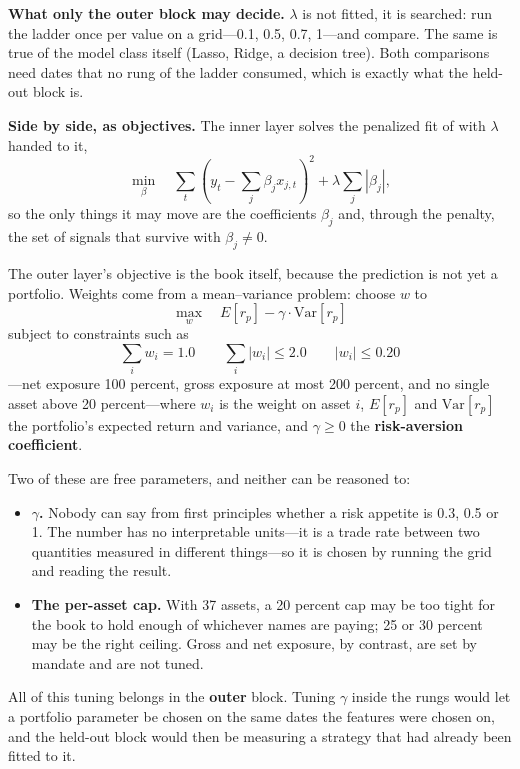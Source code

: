 \textbf{What only the outer block may decide.} $\lambda$ is not fitted, it is searched: run the
ladder once per value on a grid---0.1, 0.5, 0.7, 1---and compare. The same is true of the model class itself (Lasso, Ridge, a decision tree). Both
comparisons need dates that no rung of the ladder consumed, which is exactly what the held-out
block is.

\textbf{Side by side, as objectives.} The inner layer solves the penalized fit of
 with $\lambda$ handed to it,
\[
  \min_{\beta} \quad \sum_t \left( y_t - \sum_j \beta_j x_{j,t} \right)^{2}
    + \lambda \sum_j \left| \beta_j \right|,
\]
so the only things it may move are the coefficients $\beta_j$ and, through the penalty, the set of
signals that survive with $\beta_j \neq 0$.

The outer layer's objective is the book itself, because the prediction is not yet a portfolio.
Weights come from a mean--variance problem: choose $w$ to
\[
  \max_w \quad E[r_p] - \gamma \cdot \mathrm{Var}[r_p]
\]
subject to constraints such as
\[
  \sum_i w_i = 1.0 \qquad \sum_i \left| w_i \right| \leq 2.0 \qquad \left| w_i \right| \leq 0.20
\]
---net exposure 100 percent, gross exposure at most 200 percent, and no single asset above 20
percent---where $w_i$ is the weight on asset $i$, $E[r_p]$ and $\mathrm{Var}[r_p]$ the portfolio's
expected return and variance, and $\gamma \geq 0$ the \textbf{risk-aversion coefficient}.

Two of these are free parameters, and neither can be reasoned to:

\begin{itemize}
  \item \textbf{$\gamma$.} Nobody can say from first principles whether a risk appetite is 0.3,
        0.5 or 1. The number has no interpretable units---it is a trade rate between two
        quantities measured in different things---so it is chosen by running the grid and reading
        the result.
  \item \textbf{The per-asset cap.} With 37 assets, a 20 percent cap may be too tight for the book
        to hold enough of whichever names are paying; 25 or 30 percent may be the right ceiling.
        Gross and net exposure, by contrast, are set by mandate and are not tuned.
\end{itemize}

\begin{note}
All of this tuning belongs in the \textbf{outer} block. Tuning $\gamma$ inside the rungs would let
a portfolio parameter be chosen on the same dates the features were chosen on, and the held-out
block would then be measuring a strategy that had already been fitted to it.
\end{note}

